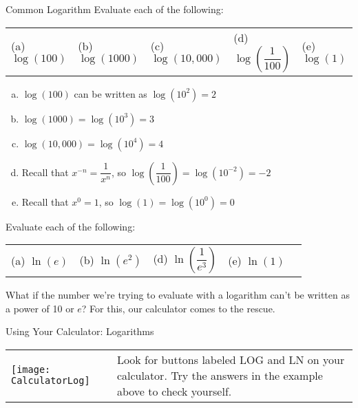 \begin{example}[https://www.youtube.com/watch?v=_OTEHIGS3qM]{Common Logarithm}
Evaluate each of the following:
\begin{center}
\begin{tabular}{l l l l l}
(a) $\log(100)$ & (b) $\log(1000)$ & (c) $\log(10,000)$ & (d) $\log\left(\dfrac{1}{100}\right)$ & (e) $\log(1)$
\end{tabular}
\end{center}

\begin{enumerate}[(a)]
\item $\log(100)$ can be written as $\log\left(10^2\right) = 2$
\item $\log(1000) = \log\left(10^3\right) = 3$
\item $\log(10,000) = \log\left(10^4\right) = 4$
\item Recall that $x^{-n} = \dfrac{1}{x^n}$, so $\log\left(\dfrac{1}{100}\right) = \log\left(10^{-2}\right) = -2$
\item Recall that $x^0=1$, so $\log(1) = \log\left(10^0\right) = 0$
\end{enumerate}
\end{example}

\begin{try}
Evaluate each of the following:
\begin{center}
\begin{tabular}{l l l l l}
(a) $\ln(e)$ & (b) $\ln(e^2)$ & (d) $\ln\left(\dfrac{1}{e^3}\right)$ & (e) $\ln(1)$
\end{tabular}
\end{center}
\end{try}

What if the number we're trying to evaluate with a logarithm can't be written as a power of 10 or $e$?  For this, our calculator comes to the rescue.

\begin{proc}{Using Your Calculator: Logarithms}
\begin{center}
\begin{tabular}{l b{3in}}
\texttt{[image: CalculatorLog]} & Look for buttons labeled LOG and LN on your calculator.  Try the answers in the example above to check yourself.
\end{tabular}
\end{center}
\end{proc}

